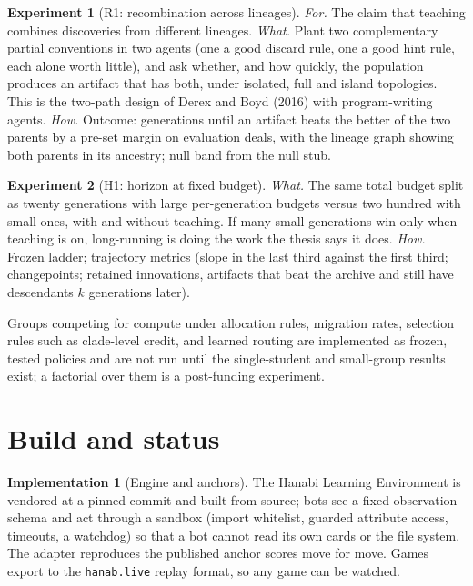 \documentclass[11pt]{article}
\numberwithin{theorem}{section}
\theoremstyle{definition}
\newtheorem{implementation}[theorem]{Implementation}
\theoremstyle{problemstyle}
\newtheorem{experiment}{Experiment}[section]
\begin{document}
\begin{experiment}[R1: recombination across lineages]
\emph{For.} The claim that teaching combines discoveries from different lineages.
\emph{What.} Plant two complementary partial conventions in two agents (one a good discard rule, one a good hint rule,
each alone worth little), and ask whether, and how quickly, the population produces an artifact that has both, under
isolated, full and island topologies. This is the two-path design of Derex and Boyd (2016) with program-writing agents.
\emph{How.} Outcome: generations until an artifact beats the better of the two parents by a pre-set margin on
evaluation deals, with the lineage graph showing both parents in its ancestry; null band from the null stub.
\end{experiment}

\begin{experiment}[H1: horizon at fixed budget]
\emph{What.} The same total budget split as twenty generations with large per-generation budgets versus two hundred
with small ones, with and without teaching. If many small generations win only when teaching is on, long-running is
doing the work the thesis says it does.
\emph{How.} Frozen ladder; trajectory metrics (slope in the last third against the first third; changepoints;
retained innovations, artifacts that beat the archive and still have descendants $k$ generations later).
\end{experiment}

\begin{remark}[Deferred]
Groups competing for compute under allocation rules, migration rates, selection rules such as clade-level credit, and
learned routing are implemented as frozen, tested policies and are not run until the single-student and small-group
results exist; a factorial over them is a post-funding experiment.
\end{remark}

\section{Build and status}\label{sec:build}

\begin{implementation}[Engine and anchors]
The Hanabi Learning Environment is vendored at a pinned commit and built from source; bots see a fixed observation
schema and act through a sandbox (import whitelist, guarded attribute access, timeouts, a watchdog) so that a bot
cannot read its own cards or the file system. The adapter reproduces the published anchor scores move for move. Games
export to the \texttt{hanab.live} replay format, so any game can be watched.
\end{implementation}
\end{document}
